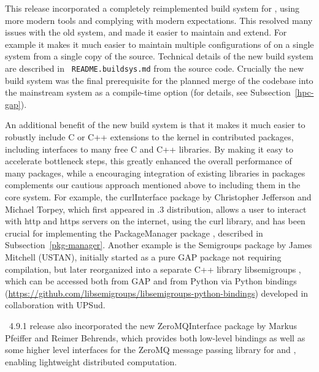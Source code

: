 \documentclass{deliverablereport}
\begin{document}
This release incorporated a completely
reimplemented build system for \GAP, using more modern tools and
complying with modern expectations. This resolved many issues with the
old system, and made it easier to maintain and extend. For example it
makes it much easier to maintain multiple configurations of \GAP on a
single system from a single copy of the source. Technical
details of the new build system are described in {\tt
  README.buildsys.md} from the \GAP source code. Crucially the new build system
was the final prerequisite for the planned  merge of the \HPCGAP codebase  into the
mainstream \GAP system as a compile-time option (for details, see
Subsection~\ref{hpc-gap}).

An additional benefit of the new build system is that it makes it much
easier to robustly include C or C++ extensions to the \GAP kernel in
contributed packages, including interfaces to many free C and C++
libraries. By making it easy to accelerate bottleneck steps, this
greatly enhanced the overall performance of many packages, while a
encouraging integration of existing libraries in packages complements
our cautious approach mentioned above to including them in the core
system. 
For example, the {\sf curlInterface} package \cite{curlInterface}
by Christopher Jefferson and Michael Torpey, which first appeared
in .3 distribution, allows a user to interact 
with http and https servers on the internet, using the {\sf curl} library, 
and has been crucial for implementing the {\sf PackageManager} package
\cite{PackageManager}, described in Subsection~\ref{pkg-manager}.
Another example is the {\sf Semigroups} package \cite{Semigroups} 
by James Mitchell (USTAN), initially started as a pure GAP
package not requiring compilation, but later reorganized into a
separate C++ library libsemigroups , which can be
accessed both from GAP and from Python via Python bindings
(\url{https://github.com/libsemigroups/libsemigroups-python-bindings})
developed in collaboration with UPSud. 

\GAP~4.9.1 release also incorporated the new {\sf ZeroMQInterface} package \cite{ZeroMQInterface} by Markus Pfeiffer and Reimer Behrends, which
provides both low-level bindings as well as some higher level interfaces
for the {\sf ZeroMQ} message passing library for \GAP and \HPCGAP, 
enabling lightweight distributed computation. 
\end{document}
